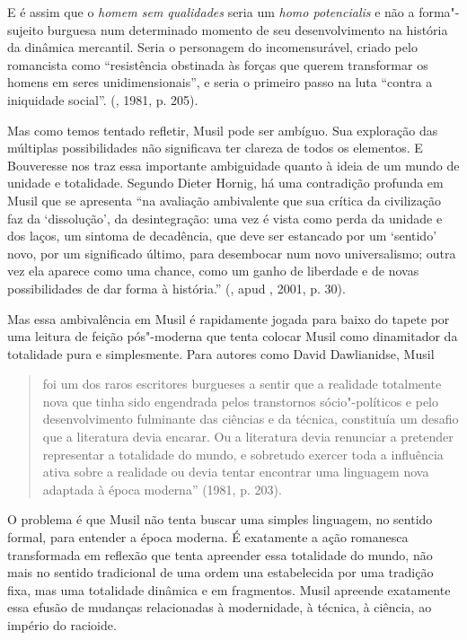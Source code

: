 E é assim que o \emph{homem sem qualidades} seria um \emph{homo
potencialis} e não a forma"-sujeito burguesa num determinado momento de
seu desenvolvimento na história da dinâmica mercantil. Seria o
personagem do incomensurável, criado pelo romancista como ``resistência
obstinada às forças que querem transformar os homens em seres
unidimensionais'', e seria o primeiro passo na luta ``contra a
iniquidade social''. (, 1981, p. 205).

Mas como temos tentado refletir, Musil pode ser ambíguo. Sua exploração
das múltiplas possibilidades não significava ter clareza de todos os
elementos. E Bouveresse nos traz essa importante ambiguidade quanto à
ideia de um mundo de unidade e totalidade. Segundo Dieter Hornig, há uma
contradição profunda em Musil que se apresenta ``na avaliação
ambivalente que sua crítica da civilização faz da `dissolução', da
desintegração: uma vez é vista como perda da unidade e dos laços, um
sintoma de decadência, que deve ser estancado por um `sentido' novo, por
um significado último, para desembocar num novo universalismo; outra vez
ela aparece como uma chance, como um ganho de liberdade e de novas
possibilidades de dar forma à história.'' (, apud ,
2001, p. 30).

Mas essa ambivalência em Musil é rapidamente jogada para baixo do tapete
por uma leitura de feição pós"-moderna que tenta colocar Musil como
dinamitador da totalidade pura e simplesmente. Para autores como David
Dawlianidse, Musil

\begin{quote}
foi um dos raros escritores burgueses a sentir que a realidade
totalmente nova que tinha sido engendrada pelos transtornos
sócio"-políticos e pelo desenvolvimento fulminante das ciências e da
técnica, constituía um desafio que a literatura devia encarar. Ou a
literatura devia renunciar a pretender representar a totalidade do
mundo, e sobretudo exercer toda a influência ativa sobre a realidade ou
devia tentar encontrar uma linguagem nova adaptada à época moderna''
(1981, p. 203).
\end{quote}

O problema é que Musil não tenta buscar uma simples linguagem, no
sentido formal, para entender a época moderna. É exatamente a ação
romanesca transformada em reflexão que tenta apreender essa totalidade
do mundo, não mais no sentido tradicional de uma ordem una estabelecida
por uma tradição fixa, mas uma totalidade dinâmica e em fragmentos.
Musil apreende exatamente essa efusão de mudanças relacionadas à
modernidade, à técnica, à ciência, ao império do racioide.

